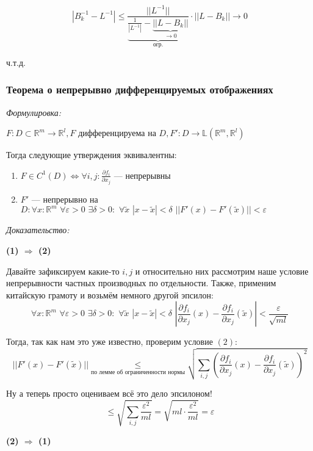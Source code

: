 \documentclass{article}
\def\dbl{\,\,}
\begin{document}
\[|B^{-1}_k - L^{-1}| \le \frac{||L^{-1}||}{\underbrace{\frac{1}{|L^{-1}|} - \underbrace{||L - B_k||}_{\rightarrow 0}}_{\text{огр.}}} \cdot ||L - B_k|| \rightarrow 0\]

ч.т.д.


\subsubsection{Теорема о непрерывно дифференцируемых отображениях}
\textit{Формулировка:}

$F: D \subset \mathbb{R}^m \rightarrow \mathbb{R}^l, F$ дифференцируема на $D, F': D \rightarrow \mathbb{L}(\mathbb{R}^m, \mathbb{R}^l)$

Тогда следующие утверждения эквивалентны:

\begin{enumerate}
    \item $F \in C^1(D) \Leftrightarrow \forall i, j: \frac{\partial f_i}{\partial x_j}$ --- непрерывны
    \item $F'$ --- непрерывно на $D: \forall x: \mathbb{R}^m \dbl \forall \varepsilon > 0 \dbl \exists \delta > 0: \dbl \forall \widetilde{x} \dbl |x - \widetilde{x}| < \delta \dbl ||F'(x) - F'(\widetilde{x})|| < \varepsilon$
\end{enumerate}

\textit{Доказательство:}

\textbf{(1) $\Rightarrow$ (2)}

Давайте зафиксируем какие-то $i, j$ и относительно них рассмотрим наше условие непрерывности частных производных по отдельности. Также, применим китайскую грамоту и возьмём немного другой эпсилон:
\[\forall x: \mathbb{R}^m \dbl \forall \varepsilon > 0 \dbl \exists \delta > 0: \dbl \forall \widetilde{x} \dbl |x - \widetilde{x}| < \delta \dbl \left|\frac{\partial f_i}{\partial x_j}(x) - \frac{\partial f_i}{\partial x_j}(\widetilde{x})\right| < \frac{\varepsilon}{\sqrt{ml}}\]

Тогда, так как нам это уже известно, проверим условие $(2)$:
\[||F'(x) - F'(\widetilde{x})|| \underset{\text{по лемме об ограниченности нормы}}{\le} \sqrt{\sum_{i, j}{\left(\frac{\partial f_i}{\partial x_j}(x) - \frac{\partial f_i}{\partial x_j}(\widetilde{x})\right)^2}}\]

Ну а теперь просто оцениваем всё это дело эпсилоном!
\[\le \sqrt{\sum_{i, j}{\frac{\varepsilon^2}{ml}}}=\sqrt{ml\cdot\frac{\varepsilon^2}{ml}} = \varepsilon\]

\textbf{(2) $\Rightarrow$ (1)}
\end{document}
